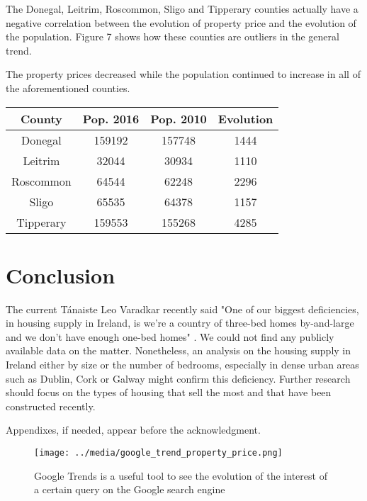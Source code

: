 \documentclass[twocolumn]{article}
\begin{document}
The Donegal, Leitrim, Roscommon, Sligo and Tipperary counties actually have a negative correlation between the evolution of property price and the evolution of the population. Figure 7 shows how these counties are outliers in the general trend.

The property prices decreased while the population continued to increase in all of the aforementioned counties.

\begin{center}
\begin{tabular}{||c c c c||}
 \hline
 County & Pop. 2016 & Pop. 2010 & Evolution \\ [0.5ex]
 \hline\hline
 Donegal & 159192 & 157748 & 1444 \\
 \hline
 Leitrim & 32044 & 30934 & 1110 \\
 \hline
 Roscommon & 64544 & 62248 & 2296 \\
 \hline
 Sligo & 65535 & 64378 & 1157 \\
 \hline
 Tipperary & 159553 & 155268 & 4285 \\ [1ex]
 \hline
\end{tabular}
\end{center}

\section{Conclusion}
The current Tánaiste Leo Varadkar recently said "One of our biggest deficiencies, in housing supply in Ireland, is we're a country of three-bed homes by-and-large and we don't have enough one-bed homes" \cite{mcgrath21}. We could not find any publicly available data on the matter. Nonetheless, an analysis on the housing supply in Ireland either by size or the number of bedrooms, especially in dense urban areas such as Dublin, Cork or Galway might confirm this deficiency. Further research should focus on the types of housing that sell the most and that have been constructed recently.

Appendixes, if needed, appear before the acknowledgment.



\raggedright

\onecolumn
\appendices
\begin{figure}[h]
	\centering
    \texttt{[image: ../media/google\_trend\_property\_price.png]}
	\caption{Google Trends is a useful tool to see the evolution of the interest of a certain query on the Google search engine}
	\label{fig1}
\end{figure}
\end{document}
